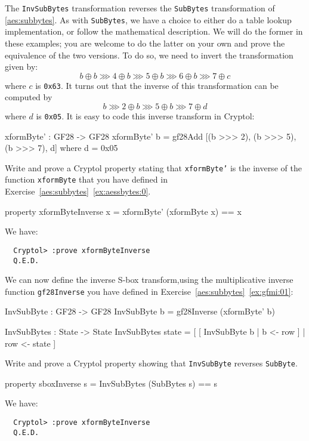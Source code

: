 The {\tt InvSubBytes} transformation reverses the {\tt SubBytes}
transformation of \autoref{aes:subbytes}. As with {\tt SubBytes},
we have a choice to either do a table lookup implementation, or follow
the mathematical description.  We will do the former in these examples;
you are welcome to do the latter on your own and prove the equivalence
of the two versions.  To do so, we need to invert the transformation
given by:
$$
 b \oplus b \ggg 4 \oplus b \ggg 5 \oplus b \ggg 6 \oplus b \ggg 7 \oplus c
$$
where $c$ is {\tt 0x63}. It turns out that the inverse of this
transformation can be computed by
$$
 b \ggg 2 \oplus b \ggg 5 \oplus b \ggg 7 \oplus d
$$
where $d$ is {\tt 0x05}.  It is easy to code this inverse transform in
Cryptol:

\begin{code}
  xformByte' : GF28 -> GF28
  xformByte' b = gf28Add [(b >>> 2), (b >>> 5), (b >>> 7), d]
    where d = 0x05
\end{code}

\begin{Exercise}\label{ex:invsb:1}
  Write and prove a Cryptol property stating that {\tt xformByte'} is
  the inverse of the function {\tt xformByte} that you have defined in
  Exercise~\ref{aes:subbytes}~\ref{ex:aessbytes:0}.
\end{Exercise}
\begin{Answer}
\begin{code}
  property xformByteInverse x = xformByte' (xformByte x) == x
\end{code}
We have:
\begin{Verbatim}
  Cryptol> :prove xformByteInverse
  Q.E.D.
\end{Verbatim}
\end{Answer}

\unparagraph We can now define the inverse S-box
transform,\indAESInvSbox using the multiplicative inverse function
{\tt gf28Inverse} you have defined in
Exercise~\ref{aes:subbytes}~\ref{ex:gfmi:01}:
\begin{code}
  InvSubByte : GF28 -> GF28
  InvSubByte b = gf28Inverse (xformByte' b)

  InvSubBytes : State -> State
  InvSubBytes state = [ [ InvSubByte b | b <- row ] 
                      | row <- state
                      ]
\end{code}

\begin{Exercise}\label{ex:invsb:2}
  Write and prove a Cryptol property showing that {\tt InvSubByte}
  reverses {\tt SubByte}.\indAESSbox
\end{Exercise}
\begin{Answer}
\begin{code}
  property sboxInverse s = InvSubBytes (SubBytes s) == s
\end{code}
We have:
\begin{Verbatim}
  Cryptol> :prove xformByteInverse
  Q.E.D.
\end{Verbatim}
\end{Answer}

